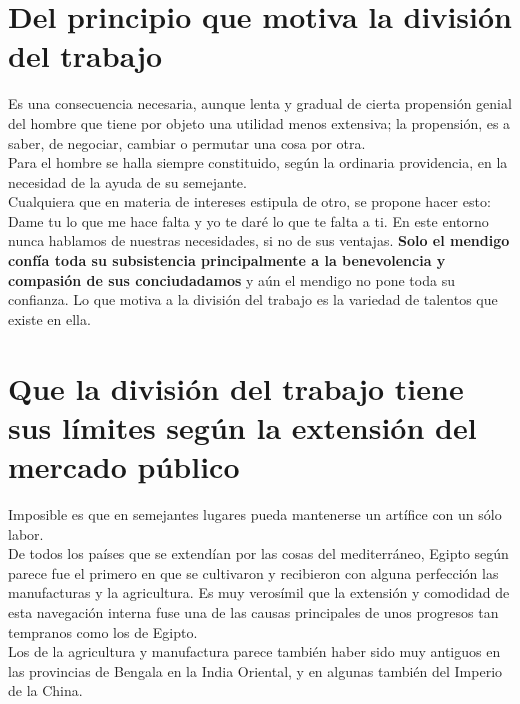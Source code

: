 \documentclass[10pt]{article}
\begin{document}
\begin{multicols}{2}
\section*{Del principio que motiva la división del trabajo}
Es una consecuencia necesaria, aunque lenta y gradual de cierta propensión genial del hombre que tiene por objeto una utilidad menos extensiva; la propensión, es a saber, de negociar, cambiar o permutar una cosa por otra. \\
Para el hombre se halla siempre constituido, según la ordinaria providencia, en la necesidad de la ayuda de su semejante.\\
Cualquiera que en materia de intereses estipula de otro, se propone hacer esto: Dame tu lo que me hace falta y yo te daré lo que te falta a ti. En este entorno nunca hablamos de nuestras necesidades, si no de sus ventajas. \textbf{Solo el mendigo confía toda su subsistencia principalmente a la benevolencia y compasión de sus conciudadamos} y aún el mendigo no pone toda su confianza. Lo que motiva a la división del trabajo es la variedad de talentos que existe en ella.
\section*{Que la división del trabajo tiene sus límites según la extensión del mercado público}
Imposible es que en semejantes lugares pueda mantenerse un artífice con un sólo labor.\\
De todos los países que se extendían por las cosas del mediterráneo, Egipto según parece fue el primero en que se cultivaron y recibieron con alguna perfección las manufacturas y la agricultura. Es muy verosímil que la extensión y comodidad de esta navegación interna fuse una de las causas principales de unos progresos tan tempranos como los de Egipto.\\
  Los de la agricultura y manufactura parece también haber sido muy antiguos en las provincias de Bengala en la India Oriental, y en algunas también del Imperio de la China. 

\end{multicols}
\end{document}
